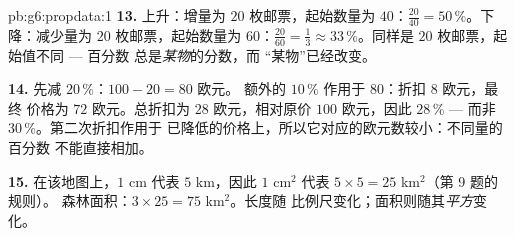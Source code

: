 \begin{solution}{pb:g6:propdata:1}
\textbf{13.} 上升：增量为 $20$ 枚邮票，起始数量为
$40$：$\frac{20}{40} = 50\,\%$。下降：减少量为 $20$
枚邮票，起始数量为 $60$：$\frac{20}{60} = \frac13 \approx
33\,\%$。同样是 $20$ 枚邮票，起始值不同 --- 百分数
总是\emph{某物}的分数，而
“某物”已经改变。

\textbf{14.} 先减 $20\,\%$：$100 - 20 = 80$ 欧元。
额外的 $10\,\%$ 作用于 $80$：折扣 $8$ 欧元，最终
价格为 $72$ 欧元。总折扣为 $28$ 欧元，相对原价 $100$ 欧元，因此
$28\,\%$ --- 而非 $30\,\%$。第二次折扣作用于
已降低的价格上，所以它对应的欧元数较小：不同量的百分数
不能直接相加。

\textbf{15.} 在该地图上，$1$ cm 代表 $5$ km，因此 $1$
cm$^2$ 代表 $5 \times 5 = 25$ km$^2$（第 9 题的规则）。
森林面积：$3 \times 25 = 75$ km$^2$。长度随
比例尺变化；面积则随其\emph{平方}变化。
\end{solution}
